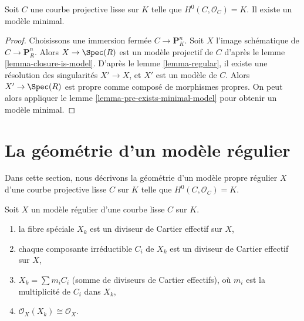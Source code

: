 \begin{proposition}
\label{proposition-exists-minimal-model}
Soit $C$ une courbe projective lisse sur $K$ telle que
$H^0(C, \mathcal{O}_C) = K$. Il existe un modèle minimal.
\end{proposition}

\begin{proof}
Choisissons une immersion fermée $C \to \mathbf{P}^n_K$. Soit
$X$ l'image schématique de $C \to \mathbf{P}^n_R$.
Alors $X \to \Spec(R)$ est un modèle projectif de $C$ d'après le
lemme \ref{lemma-closure-is-model}.
D'après le lemme \ref{lemma-regular}, il existe une résolution
des singularités $X' \to X$, et $X'$ est un modèle de $C$.
Alors $X' \to \Spec(R)$ est propre comme composé de morphismes propres.
On peut alors appliquer le lemme \ref{lemma-pre-exists-minimal-model}
pour obtenir un modèle minimal.
\end{proof}





\section{La géométrie d'un modèle régulier}
\label{section-special-fibre}

\noindent
Dans cette section, nous décrivons la géométrie d'un modèle propre régulier $X$ d'une
courbe projective lisse $C$ sur $K$ telle que $H^0(C, \mathcal{O}_C) = K$.

\begin{lemma}
\label{lemma-divisor-special-fiber}
Soit $X$ un modèle régulier d'une courbe lisse $C$ sur $K$.
\begin{enumerate}
\item la fibre spéciale $X_k$ est un diviseur de Cartier effectif sur $X$,
\item chaque composante irréductible $C_i$ de $X_k$ est un diviseur de
Cartier effectif sur $X$,
\item $X_k = \sum m_i C_i$ (somme de diviseurs de Cartier effectifs),
où $m_i$ est la multiplicité de $C_i$ dans $X_k$,
\item $\mathcal{O}_X(X_k) \cong \mathcal{O}_X$.
\end{enumerate}
\end{lemma}

